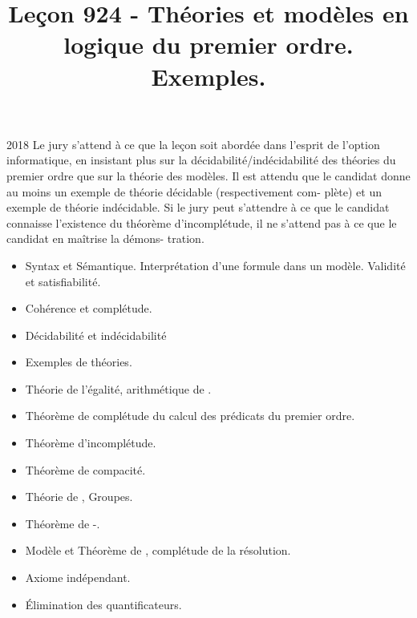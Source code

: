 \documentclass{agregfiche}
\title{Leçon 924 - Théories et modèles en logique du premier ordre. 
Exemples.}
\begin{document}
\maketitle

\secrapports
\begin{rapport}{2018}
    Le jury s’attend à ce que la leçon soit abordée dans l’esprit de 
    l’option informatique, en insistant plus
    sur la décidabilité/indécidabilité des théories du premier ordre 
    que sur la théorie des modèles.
    Il est attendu que le candidat donne au moins un exemple de 
    théorie décidable (respectivement com-
    plète) et un exemple de théorie indécidable. Si le jury peut 
    s’attendre à ce que le candidat connaisse
    l’existence du théorème d’incomplétude, il ne s’attend pas à ce 
    que le candidat en maîtrise la démons-
    tration.
\end{rapport}

\secindispensables

\begin{itemize}
	\item Syntax et Sémantique. Interprétation d’une formule dans un 
	modèle. Validité et satisfiabilité. 
    \item Cohérence et complétude. 
    \item Décidabilité et indécidabilité
    \item Exemples de théories.
\end{itemize}





\secasavoir

\begin{itemize}
	\item Théorie de l'égalité, arithmétique de .
    \item  Théorème de complétude du calcul des prédicats du premier 
    ordre.
    \item Théorème d'incomplétude.
    \item Théorème de compacité.
\end{itemize}

\secidees

\begin{itemize}
    \item Théorie de , Groupes.
	\item Théorème de -.
    \item Modèle et Théorème de , complétude de la 
    résolution.
    \item Axiome indépendant.
    \item Élimination des quantificateurs.
\end{itemize}
\end{document}
